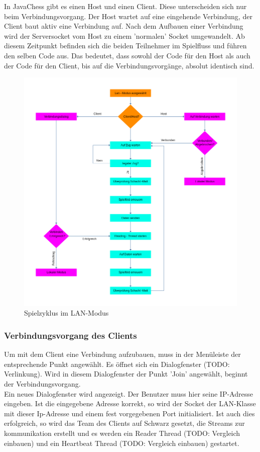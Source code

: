 \documentclass[12pt,a4paper]{article}
\begin{document}
{In JavaChess gibt es einen Host und einen Client. Diese unterscheiden sich nur beim Verbindungsvorgang. Der Host wartet auf eine eingehende Verbindung, der Client baut aktiv eine Verbindung auf. Nach dem Aufbauen einer Verbindung wird der Serversocket vom Host zu einem 'normalen' Socket umgewandelt. Ab diesem Zeitpunkt befinden sich die beiden Teilnehmer im Spielfluss und führen den selben Code aus. Das bedeutet, dass sowohl der Code für den Host als auch der Code für den Client, bis auf die Verbindungsvorgänge, absolut identisch sind. 


\begin{figure}[H]
  \centering
   	\includegraphics[width=16cm]{graphics/SpielflussLAN.png}
  \caption{Spielzyklus im LAN-Modus}
  \label{fig:lan}
\end{figure}


\subsubsection{Verbindungsvorgang des Clients}
\label{SUBSUBSEC:CONCLI}

Um mit dem Client eine Verbindung aufzubauen, muss in der Menüleiste der entsprechende Punkt angewählt. Es öffnet sich ein Dialogfenster (TODO: Verlinkung). Wird in diesem Dialogfenster der Punkt 'Join' angewählt, beginnt der Verbindungsvorgang. \\[2ex]
Ein neues Dialogfenster wird angezeigt. Der Benutzer muss hier seine IP-Adresse eingeben. 
Ist die eingegebene Adresse korrekt, so wird der Socket der LAN-Klasse mit dieser Ip-Adresse und einem fest vorgegebenen Port initialisiert. 
Ist auch dies erfolgreich, so wird das Team des Clients auf Schwarz gesetzt, die Streams zur kommunikation erstellt und es werden ein Reader Thread (TODO: Vergleich einbauen) und ein Heartbeat Thread (TODO: Vergleich einbauen) gestartet.\\[2ex]

}
\end{document}
